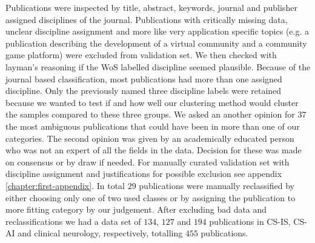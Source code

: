 Publications were inspected by title, abstract, keywords, journal
and publisher assigned disciplines of the journal. Publications
with critically missing data, unclear discipline assignment and
more like very application specific topics (e.g. a publication 
describing the development of a virtual community and a community
game platform) were excluded from validation set. 
We then checked with layman's reasoning if the WoS labelled 
discipline seemed plausible. Because of the journal based 
classification, most publications had more than one assigned 
discipline. Only the previously named three discipline labels were 
retained because we wanted to test if and how well our clustering 
method would cluster the samples compared to these three 
groups. We asked an another opinion for 37 the most ambiguous 
publications that could have been in more than one of our 
categories. The second opinion was given by an academically educated 
person who was not an expert of all the fields in the data. 
Decision for these was made on consensus or by draw if needed.
For manually curated
validation set with discipline assignment and justifications for
possible exclusion see appendix \ref{chapter:first-appendix}.
In total $29$ publications were manually reclassified by either
choosing only one of two used classes or by assigning the 
publication to more fitting category by our judgement. After
excluding bad data and reclassifications we had a data set of 
$134$, $127$ and $194$ publications in CS-IS, CS-AI and clinical
neurology, respectively, totalling $455$ publications.

